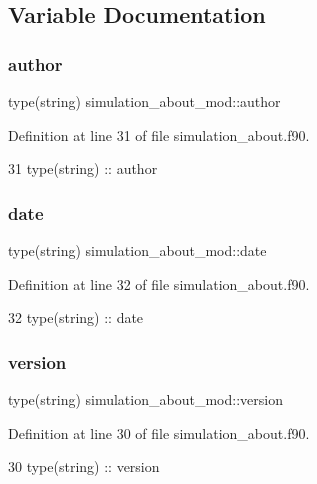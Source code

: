 \subsection{Variable Documentation}
\mbox{\label{namespacesimulation__about__mod_a49c4e8683dee7c3a2cd52658879c6e38}} 
\subsubsection{\texorpdfstring{author}{author}}
{\footnotesize\ttfamily type(string) simulation\+\_\+about\+\_\+mod\+::author\hspace{0.3cm}{\ttfamily [private]}}



Definition at line 31 of file simulation\+\_\+about.\+f90.


\begin{DoxyCode}
31     \textcolor{keywordtype}{type}(string) :: author
\end{DoxyCode}
\mbox{\label{namespacesimulation__about__mod_ad2ae0e434e2c6b0221094f181a538dc6}} 
\subsubsection{\texorpdfstring{date}{date}}
{\footnotesize\ttfamily type(string) simulation\+\_\+about\+\_\+mod\+::date\hspace{0.3cm}{\ttfamily [private]}}



Definition at line 32 of file simulation\+\_\+about.\+f90.


\begin{DoxyCode}
32     \textcolor{keywordtype}{type}(string) :: date
\end{DoxyCode}
\mbox{\label{namespacesimulation__about__mod_aa52b892695e36d427843d6e035b37d36}} 
\subsubsection{\texorpdfstring{version}{version}}
{\footnotesize\ttfamily type(string) simulation\+\_\+about\+\_\+mod\+::version\hspace{0.3cm}{\ttfamily [private]}}



Definition at line 30 of file simulation\+\_\+about.\+f90.


\begin{DoxyCode}
30     \textcolor{keywordtype}{type}(string) :: version
\end{DoxyCode}
